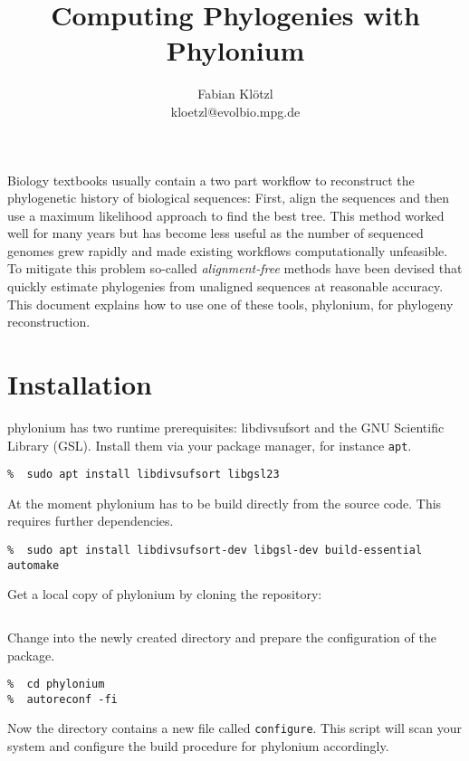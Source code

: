 \documentclass[a4paper,10pt,english]{scrartcl}
\title{Computing Phylogenies with Phylonium}
\author{Fabian Klötzl\\\normalsize{kloetzl@evolbio.mpg.de}}
\date{\isodate{\today}}
\newcommand{\tool}[1]{\textsf{#1}}
\newcommand{\phylonium}{\textsf{phylonium}\xspace}
\begin{document}
\frenchspacing
\maketitle


Biology textbooks usually contain a two part workflow to reconstruct the phylogenetic history of biological sequences: %
First, align the sequences and then use a maximum likelihood approach to find the best tree. This method worked well for many years but has become less useful as the number of sequenced genomes grew rapidly and made existing workflows computationally unfeasible. To mitigate this problem so-called \emph{alignment-free} methods have been devised that quickly estimate phylogenies from unaligned sequences at reasonable accuracy. This document explains how to use one of these tools, \phylonium, for phylogeny reconstruction. 

\section{Installation}

\phylonium has two runtime prerequisites: \tool{libdivsufsort} and the \tool{GNU Scientific Library} (GSL). Install them via your package manager, for instance \lstinline!apt!.

\begin{lstlisting}
%  sudo apt install libdivsufsort libgsl23
\end{lstlisting}

At the moment \phylonium has to be build directly from the source code. This requires further dependencies.

\begin{lstlisting}
%  sudo apt install libdivsufsort-dev libgsl-dev build-essential automake
\end{lstlisting}

Get a local copy of \phylonium by cloning the repository:

\begin{lstlisting}[language=bash]
%  git clone https://github.com/evolbioinf/phylonium
\end{lstlisting}

Change into the newly created directory and prepare the configuration of the package.

\begin{lstlisting}
%  cd phylonium
%  autoreconf -fi
\end{lstlisting}

Now the directory contains a new file called \lstinline!configure!. This script will scan your system and configure the build procedure for \phylonium accordingly.
\end{document}
